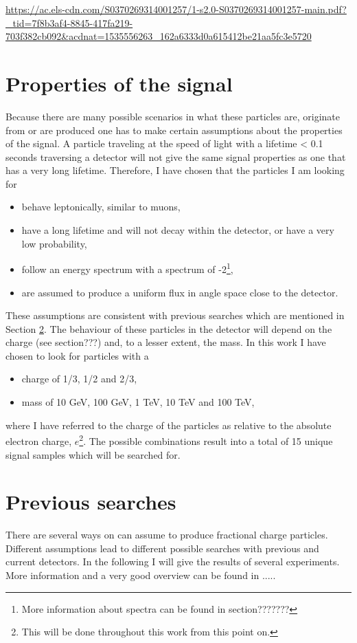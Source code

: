 \url{https://ac.els-cdn.com/S0370269314001257/1-s2.0-S0370269314001257-main.pdf?_tid=7f8b3af4-8845-417fa219-703f382cb092&acdnat=1535556263_162a6333d0a615412be21aa5fc3e5720
}

\section{Properties of the signal}
Because there are many possible scenarios in what these particles are, originate from or are produced one has to make certain assumptions about the properties of the signal. A particle traveling at the speed of light with a lifetime < 0.1 seconds traversing a detector will not give the same signal properties as one that has a very long lifetime. Therefore, I have chosen that the particles I am looking for

\begin{itemize}
\item behave leptonically, similar to muons,
\item have a long lifetime and will not decay within the detector, or have a very low probability,
\item follow an energy spectrum with a spectrum of -2\footnote{More information about spectra can be found in section???????},
\item are assumed to produce a uniform flux in angle space close to the detector.
\end{itemize}
These assumptions are consistent with previous searches which are mentioned in Section \ref{sec:prevsearches}. The behaviour of these particles in the detector will depend on the charge (see section???) and, to a lesser extent, the mass. In this work I have chosen to look for particles with a

\begin{itemize}
\item charge of 1/3, 1/2 and 2/3,
\item mass of 10 GeV, 100 GeV, 1 TeV, 10 TeV and 100 TeV,
\end{itemize}

where I have referred to the charge of the particles as relative to the absolute electron charge, $e$\footnote{This will be done throughout this work from this point on.}. The possible combinations result into a total of 15 unique signal samples which will be searched for.

\section{Previous searches}
\label{sec:prevsearches}
There are several ways on can assume to produce fractional charge particles. Different assumptions lead to different possible searches with previous and current detectors. In the following I will give the results of several experiments. More information and a very good overview can be found in .....
